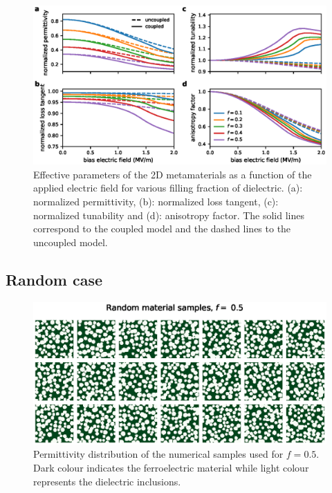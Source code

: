 \documentclass[openacc]{rsproca_new}%
\begin{document}
\begin{figure}[!t]
 \centering
 \includegraphics[width=1\textwidth]{effective_params_per}
 \caption{Effective parameters of the 2D metamaterials as a function of the
  applied electric field for various filling fraction of dielectric.
  (a): normalized permittivity, (b): normalized loss tangent, (c): normalized tunability and
  (d): anisotropy factor. The solid lines correspond to the coupled model and
  the dashed lines to the uncoupled model.}
 \label{eff_par_2D_TM}
\end{figure}

\subsection{Random case}
\begin{figure}
 \centering
 \includegraphics[width=0.8\columnwidth]{random_samples_f_50percent}
 \caption{Permittivity distribution of the numerical samples used for $f=0.5$. Dark
  colour indicates the ferroelectric material while light colour represents the
  dielectric inclusions.}
 \label{randmatepsi}
\end{figure}
\end{document}
